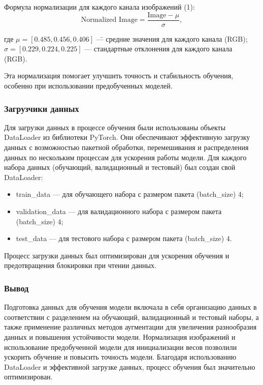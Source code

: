 {    Формула нормализации для каждого канала изображений (1):
    \[
    \text{Normalized Image} = \frac{\text{Image} - \mu}{\sigma}, \tag{1}
    \]
    \begin{tabbing}
        где 
        \=\(\mu = [0.485, 0.456, 0.406]\) \= — средние значения для каждого канала (RGB); \\
        \>\(\sigma = [0.229, 0.224, 0.225]\) \> — стандартные отклонения для каждого канала \\ (RGB).
    \end{tabbing}
    
    Эта нормализация помогает улучшить точность и стабильность обучения, особенно при использовании предобученных моделей.

    \subsubsection*{Загрузчики данных}

    Для загрузки данных в процессе обучения были использованы объекты DataLoader из библиотеки PyTorch. Они обеспечивают эффективную загрузку данных с возможностью пакетной обработки, перемешивания и распределения данных по нескольким процессам для ускорения работы модели. Для каждого набора данных (обучающий, валидационный и тестовый) был создан свой DataLoader:
    \begin{itemize}
        \item train\_data — для обучающего набора с размером пакета (batch\_size) 4;
        \item validation\_data — для валидационного набора с размером пакета \\ (batch\_size) 4;
        \item test\_data — для тестового набора с размером пакета (batch\_size) 4.
    \end{itemize}

    Процесс загрузки данных был оптимизирован для ускорения обучения и предотвращения блокировки при чтении данных.

    \subsubsection*{Вывод}

    Подготовка данных для обучения модели включала в себя организацию данных в соответствии с разделением на обучающий, валидационный и тестовый наборы, а также применение различных методов аугментации для увеличения разнообразия данных и повышения устойчивости модели. Нормализация изображений и использование предобученной модели для инициализации весов позволили ускорить обучение и повысить точность модели. Благодаря использованию DataLoader и эффективной загрузке данных, процесс обучения был значительно оптимизирован.

}
